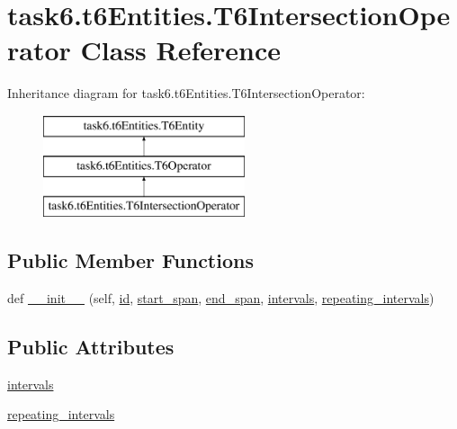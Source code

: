\hypertarget{classtask6_1_1t6Entities_1_1T6IntersectionOperator}{}\section{task6.\+t6\+Entities.\+T6\+Intersection\+Operator Class Reference}
\label{classtask6_1_1t6Entities_1_1T6IntersectionOperator}
Inheritance diagram for task6.\+t6\+Entities.\+T6\+Intersection\+Operator\+:\begin{figure}[H]
\begin{center}
\leavevmode
\includegraphics[height=3.000000cm]{classtask6_1_1t6Entities_1_1T6IntersectionOperator}
\end{center}
\end{figure}
\subsection*{Public Member Functions}
\begin{DoxyCompactItemize}
\item 
def \hyperlink{classtask6_1_1t6Entities_1_1T6IntersectionOperator_a09d2c525342b096bbbff094dfb3ba3ac}{\+\_\+\+\_\+init\+\_\+\+\_\+} (self, \hyperlink{classtask6_1_1t6Entities_1_1T6Entity_afeeced8134bb3ebe0cfecc64d0ab46a4}{id}, \hyperlink{classtask6_1_1t6Entities_1_1T6Entity_a52779e9af8864dc98e8b02fc5b9b041a}{start\+\_\+span}, \hyperlink{classtask6_1_1t6Entities_1_1T6Entity_aeb402200b156cd9562c5111dfe777b98}{end\+\_\+span}, \hyperlink{classtask6_1_1t6Entities_1_1T6IntersectionOperator_ad0babf5eab389a9e9d48109f2db05dc2}{intervals}, \hyperlink{classtask6_1_1t6Entities_1_1T6IntersectionOperator_ad8792e2967320f1650f5f51ea1d416f3}{repeating\+\_\+intervals})
\end{DoxyCompactItemize}
\subsection*{Public Attributes}
\begin{DoxyCompactItemize}
\item 
\hyperlink{classtask6_1_1t6Entities_1_1T6IntersectionOperator_ad0babf5eab389a9e9d48109f2db05dc2}{intervals}
\item 
\hyperlink{classtask6_1_1t6Entities_1_1T6IntersectionOperator_ad8792e2967320f1650f5f51ea1d416f3}{repeating\+\_\+intervals}
\end{DoxyCompactItemize}


